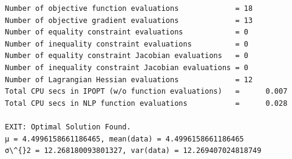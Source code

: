 \documentclass[11pt]{article}
\begin{document}
\begin{Verbatim}[commandchars=\\\{\}]
Number of objective function evaluations             = 18
Number of objective gradient evaluations             = 13
Number of equality constraint evaluations            = 0
Number of inequality constraint evaluations          = 0
Number of equality constraint Jacobian evaluations   = 0
Number of inequality constraint Jacobian evaluations = 0
Number of Lagrangian Hessian evaluations             = 12
Total CPU secs in IPOPT (w/o function evaluations)   =      0.007
Total CPU secs in NLP function evaluations           =      0.028

EXIT: Optimal Solution Found.
μ = 4.4996158661186465, mean(data) = 4.4996158661186465
σ\^{}2 = 12.268180093801327, var(data) = 12.269407024818749

    \end{Verbatim}


    
    



    
    
\end{document}
